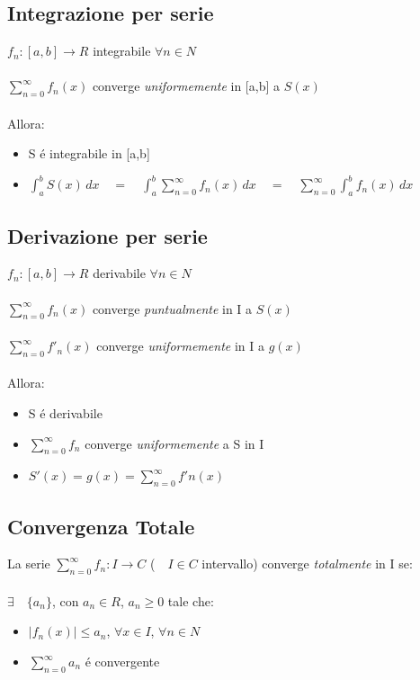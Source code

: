 \documentclass[a4paper,10pt,italian]{article}
\begin{document}
\subsection{Integrazione per serie}
$f_n:[a,b]\rightarrow R$ integrabile $\forall n \in N$ \\ \\
$\sum_{n=0}^{\infty}f_n(x)$ converge \emph{uniformemente} in [a,b] a $S(x)$ \\ \\
Allora:
\begin{itemize}
\item S \'e integrabile in [a,b]
\item $\int_{a}^{b}S(x)\,dx 
\quad = \quad \int_{a}^{b}\sum_{n=0}^{\infty}f_n(x)\,dx 
\quad = \quad \sum_{n=0}^{\infty} \int_{a}^{b} f_n(x)\,dx$
\end{itemize}

\subsection{Derivazione per serie}
$f_n:[a,b]\rightarrow R$ derivabile $\forall n \in N$ \\ \\
$\sum_{n=0}^{\infty}f_n(x)$ converge \emph{puntualmente} in I a $S(x)$ \\ \\
$\sum_{n=0}^{\infty}f'_n(x)$ converge \emph{uniformemente} in I a $g(x)$ \\ \\
Allora:
\begin{itemize}
\item S \'e derivabile
\item $\sum_{n=0}^{\infty} f_n$ converge \emph{uniformemente} a S in I
\item $S'(x) = g(x) = \sum_{n=0}^{\infty}f'n(x)$
\end{itemize}

\subsection{Convergenza Totale}
La serie $\sum_{n=0}^{\infty} f_n:I\rightarrow C $ ($\quad I\in C$ intervallo) converge \emph{totalmente} in I se: \\ \\
$\exists \quad \{a_n\}$, con $a_n \in R$, $a_n \geq 0$ tale che:
\begin{itemize}
\item $\mid f_n(x) \mid \leq a_n$, $\forall x \in I$, $\forall n \in N$
\item $\sum_{n=0}^{\infty} a_n$ \'e convergente
\end{itemize}
\end{document}
